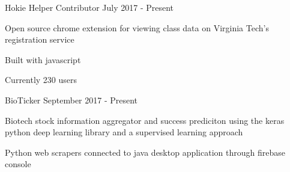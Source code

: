 
\begin{cventries}


  \cvextra 
    {Hokie Helper Contributor}
    {July 2017 - Present}
    {
	\begin{cvitems}
	  \item {Open source chrome extension for viewing class data on Virginia Tech's registration service}
	  \item {Built with javascript}
	  \item {Currently 230 users}
	\end{cvitems}
    }
  \cvextra
    {BioTicker}
    {September 2017 - Present}
    {
	\begin{cvitems}
	  \item {Biotech stock information aggregator and success prediciton using the keras python deep learning library and a supervised learning approach}
	  \item {Python web scrapers connected to java desktop application through firebase console}
	\end{cvitems}
    }

\end{cventries}

